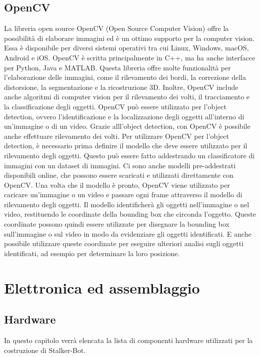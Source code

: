 \documentclass[12pt]{report}
\begin{document}
\section{OpenCV} 
La libreria open source OpenCV (Open Source Computer Vision) offre la possibilit\`a di elaborare immagini ed \`e un ottimo supporto per la computer vision. Essa \`e disponibile per diversi sistemi operativi tra cui Linux, Windows, macOS, Android e iOS.
OpenCV \`e scritta principalmente in C++, ma ha anche interfacce per Python, Java e MATLAB. Questa libreria offre molte funzionalit\`a per l'elaborazione delle immagini, come il rilevamento dei bordi, la correzione della distorsione, la segmentazione e la ricostruzione
3D. Inoltre, OpenCV include anche algoritmi di computer vision per il rilevamento dei volti, il
tracciamento e la classificazione degli oggetti.
OpenCV pu\`o essere utilizzato per l'object detection, ovvero l'identificazione e la localizzazione degli oggetti all'interno di un'immagine o di un video. Grazie alll'object detection, con OpenCV \`e possibile anche effettuare rilevamento dei volti.
Per utilizzare OpenCV per l'object detection, \`e necessario prima definire il modello che deve essere utilizzato per il rilevamento degli oggetti. Questo pu\`o essere fatto addestrando un
classificatore di immagini con un dataset di immagini. Ci sono anche modelli pre-addestrati disponibili online, che possono essere scaricati e utilizzati direttamente con OpenCV.
Una volta che il modello \`e pronto, OpenCV viene utilizzato per caricare un'immagine o un video e passare ogni frame attraverso il modello di rilevamento degli oggetti. Il modello identificher\`a gli oggetti nell'immagine o nel video, restituendo le coordinate della bounding box che circonda l'oggetto.
Queste coordinate possono quindi essere utilizzate per disegnare la bounding box sull'immagine o sul video in modo da evidenziare gli oggetti identificati. E anche possibile utilizzare queste coordinate per eseguire ulteriori analisi sugli oggetti identificati, ad esempio per determinare la loro posizione.



\chapter{Elettronica ed assemblaggio}


\section{Hardware}
In questo capitolo verrà elencata la lista di componenti hardware utilizzati per la costruzione di Stalker-Bot.
\end{document}
